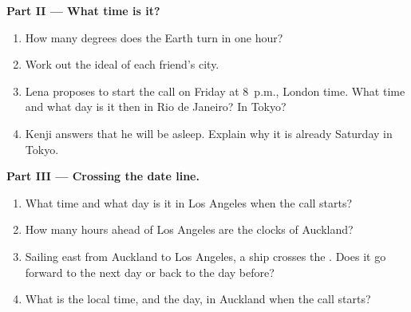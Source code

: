 \begin{problem}
\medskip
\noindent\textbf{Part II --- What time is it?}
\begin{enumerate}[resume]
  \item How many degrees does the Earth turn in one hour?
  \item Work out the ideal  of each friend's city.
  \item Lena proposes to start the call on Friday at 8~p.m., London time.
        What time and what day is it then in Rio de Janeiro? In Tokyo?
  \item Kenji answers that he will be asleep. Explain why it is already
        Saturday in Tokyo.
\end{enumerate}

\medskip
\noindent\textbf{Part III --- Crossing the date line.}
\begin{enumerate}[resume]
  \item What time and what day is it in Los Angeles when the call starts?
  \item How many hours ahead of Los Angeles are the clocks of Auckland?
  \item Sailing east from Auckland to Los Angeles, a ship crosses the . Does it go forward to the next day or back to the day before?
  \item What is the local time, and the day, in Auckland when the call
        starts?
\end{enumerate}
\end{problem}

